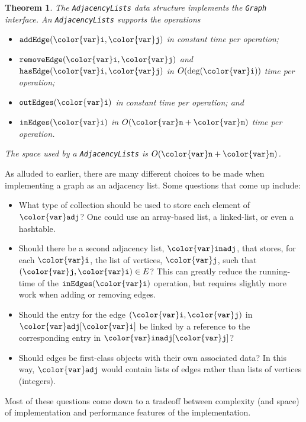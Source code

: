 \documentclass[10pt]{book}
\newcommand{\cpponly}[1]{}\newcommand{\javaonly}[1]{#1}\newcommand{\pcodeonly}[1]{}\newcommand{\notpcode}[1]{#1}\newcommand{\lang}{Java}
\theoremstyle{plain}
\newtheorem{thm}{Theorem}[chapter]
\theoremstyle{definition}
\begin{document}
\begin{thm}
The \texttt{AdjacencyLists} data structure implements the \texttt{Graph} interface.
An \texttt{AdjacencyLists} supports the operations
\begin{itemize}
  \item \ensuremath{\mathtt{addEdge({\color{var}i},{\color{var}j})}} in constant time per operation;
  \item \ensuremath{\mathtt{removeEdge({\color{var}i},{\color{var}j})}} and \ensuremath{\mathtt{hasEdge({\color{var}i},{\color{var}j})}} in $O(\deg(\ensuremath{\mathtt{{\color{var}i}}}))$ time
    per operation;
  \javaonly{\item \ensuremath{\mathtt{outEdges({\color{var}i})}} in constant time per operation; and}
  \cpponly{\item \ensuremath{\mathtt{outEdges({\color{var}i})}} in $O(\deg(\ensuremath{\mathtt{{\color{var}i}}}))$ time per operation; and}
  \item \ensuremath{\mathtt{inEdges({\color{var}i})}} in $O(\ensuremath{\mathtt{{\color{var}n}}}+\ensuremath{\mathtt{{\color{var}m}}})$ time per operation.
\end{itemize}
The space used by a \texttt{AdjacencyLists} is  $O(\ensuremath{\mathtt{{\color{var}n}}}+\ensuremath{\mathtt{{\color{var}m}}})$.
\end{thm}

As alluded to earlier, there are many different choices to be made when
implementing a graph as an adjacency list.  Some questions that come
up include:
\begin{itemize}
  \item What type of collection should be used to store each element
  of \ensuremath{\mathtt{{\color{var}adj}}}?  One could use an array-based list,  a linked-list, or even
  a hashtable.
  \item Should there be a second adjacency list, \ensuremath{\mathtt{{\color{var}inadj}}}, that stores,
  for each \ensuremath{\mathtt{{\color{var}i}}}, the list of vertices, \ensuremath{\mathtt{{\color{var}j}}}, such that $\ensuremath{\mathtt{({\color{var}j},{\color{var}i})}}\in E$?
  This can greatly reduce the running-time of the \ensuremath{\mathtt{inEdges({\color{var}i})}}
  operation, but requires slightly more work when adding or removing
  edges.
  \item Should the entry for the edge \ensuremath{\mathtt{({\color{var}i},{\color{var}j})}} in \ensuremath{\mathtt{{\color{var}adj}[{\color{var}i}]}} be linked by
  a reference to the corresponding entry in \ensuremath{\mathtt{{\color{var}inadj}[{\color{var}j}]}}?
  \item Should edges be first-class objects with their own associated data?
  In this way, \ensuremath{\mathtt{{\color{var}adj}}} would contain lists of edges rather than lists of vertices (integers).
\end{itemize}
Most of these questions come down to a tradeoff between complexity (and
space) of implementation and performance features of the implementation.
\end{document}
